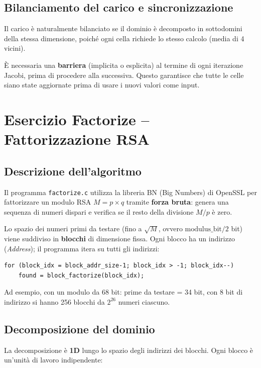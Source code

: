 \documentclass[a4paper,12pt]{article}
\begin{document}
\subsection{Bilanciamento del carico e sincronizzazione}

Il carico \`e naturalmente bilanciato se il dominio \`e decomposto in sottodomini della stessa dimensione, poich\'e ogni cella richiede lo stesso calcolo (media di 4 vicini).

\`E necessaria una \textbf{barriera} (implicita o esplicita) al termine di ogni iterazione Jacobi, prima di procedere alla successiva. Questo garantisce che tutte le celle siano state aggiornate prima di usare i nuovi valori come input.

\section{Esercizio Factorize -- Fattorizzazione RSA}

\subsection{Descrizione dell'algoritmo}

Il programma \texttt{factorize.c} utilizza la libreria BN (Big Numbers) di OpenSSL per fattorizzare un modulo RSA $M = p \times q$ tramite \textbf{forza bruta}: genera una sequenza di numeri dispari e verifica se il resto della divisione $M / p$ \`e zero.

Lo spazio dei numeri primi da testare (fino a $\sqrt{M}$, ovvero $\text{modulus\_bit}/2$ bit) viene suddiviso in \textbf{blocchi} di dimensione fissa. Ogni blocco ha un indirizzo (\textit{Address}); il programma itera su tutti gli indirizzi:

\begin{lstlisting}
for (block_idx = block_addr_size-1; block_idx > -1; block_idx--)
    found = block_factorize(block_idx);
\end{lstlisting}

Ad esempio, con un modulo da 68 bit: prime da testare = 34 bit, con 8 bit di indirizzo si hanno 256 blocchi da $2^{26}$ numeri ciascuno.

\subsection{Decomposizione del dominio}

La decomposizione \`e \textbf{1D} lungo lo spazio degli indirizzi dei blocchi. Ogni blocco \`e un'unit\`a di lavoro indipendente:
\end{document}
